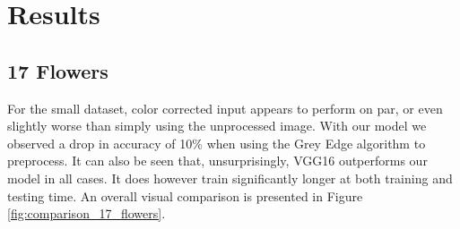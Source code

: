 \section{Results}

\def\pgfmathprintpmnumber#1#2{%
    \pgfmathfloatparsenumber{\thisrow{#1}}%
    \let\valueAvg=\pgfmathresult
    \pgfmathfloatparsenumber{\thisrow{#2}}%
    \let\valueStd=\pgfmathresult
    \edef\valueAvg{\noexpand\pgfmathprintnumber[std, precision=2]{\valueAvg}}%
    \edef\valueStd{\noexpand\pgfmathprintnumber[std, precision=2]{\valueStd}}%
    \toks0=\expandafter{\valueAvg}%
    \toks1=\expandafter{\valueStd}%
    \edef\value{\the\toks0$\pm$\the\toks1}%
}

\subsection{17 Flowers}

For the small dataset, color corrected input appears to perform on par, or even slightly worse than simply using the unprocessed image.
With our model we observed a drop in accuracy of 10\% when using the Grey Edge algorithm to preprocess. It can also be seen that,
unsurprisingly, VGG16 outperforms our model in all cases. It does however train significantly longer at both training and testing time.
An overall visual comparison is presented in Figure \ref{fig:comparison_17_flowers}.

